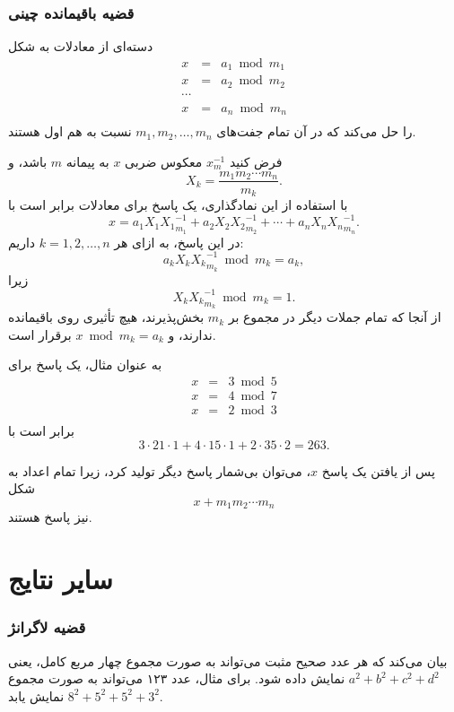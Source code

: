 \subsubsection{قضیه باقیمانده چینی}


 دسته‌ای از معادلات به شکل
\[
\begin{array}{lcl}
x & = & a_1 \bmod m_1 \\
x & = & a_2 \bmod m_2 \\
\cdots \\
x & = & a_n \bmod m_n \\
\end{array}
\]
را حل می‌کند که در آن تمام جفت‌های $m_1,m_2,\ldots,m_n$ نسبت به هم اول هستند.

فرض کنید $x^{-1}_m$ معکوس ضربی $x$ به پیمانه $m$ باشد، و
\[ X_k = \frac{m_1 m_2 \cdots m_n}{m_k}.\]
با استفاده از این نمادگذاری، یک پاسخ برای معادلات برابر است با
\[x = a_1 X_1 {X_1}^{-1}_{m_1} + a_2 X_2 {X_2}^{-1}_{m_2} + \cdots + a_n X_n {X_n}^{-1}_{m_n}.\]
در این پاسخ، به ازای هر $k=1,2,\ldots,n$ داریم:
\[a_k X_k {X_k}^{-1}_{m_k} \bmod m_k = a_k,\]
زیرا
\[X_k {X_k}^{-1}_{m_k} \bmod m_k = 1.\]
از آنجا که تمام جملات دیگر در مجموع بر $m_k$ بخش‌پذیرند،
هیچ تأثیری روی باقیمانده ندارند،
و $x \bmod m_k = a_k$ برقرار است.

به عنوان مثال، یک پاسخ برای
\[
\begin{array}{lcl}
x & = & 3 \bmod 5 \\
x & = & 4 \bmod 7 \\
x & = & 2 \bmod 3 \\
\end{array}
\]
برابر است با
\[ 3 \cdot 21 \cdot 1 + 4 \cdot 15 \cdot 1 + 2 \cdot 35 \cdot 2 = 263.\]

پس از یافتن یک پاسخ $x$،
می‌توان بی‌شمار پاسخ دیگر تولید کرد،
زیرا تمام اعداد به شکل
\[x+m_1 m_2 \cdots m_n\]
نیز پاسخ هستند.

\section{سایر نتایج}

\subsubsection{قضیه لاگرانژ}


بیان می‌کند که هر عدد صحیح مثبت
می‌تواند به صورت مجموع چهار مربع کامل، یعنی
$a^2+b^2+c^2+d^2$ نمایش داده شود.
برای مثال، عدد ۱۲۳ می‌تواند به صورت
مجموع $8^2+5^2+5^2+3^2$ نمایش یابد.

